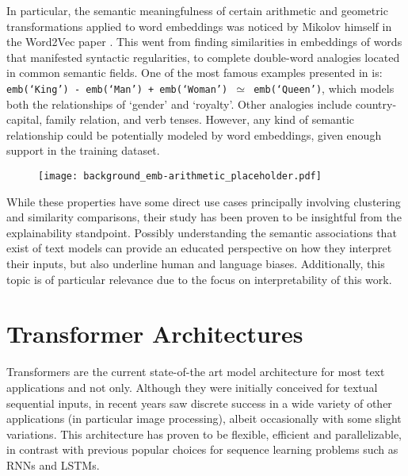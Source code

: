 In particular, the semantic meaningfulness of certain arithmetic and geometric transformations applied to word embeddings was noticed by Mikolov himself in the Word2Vec paper \cite{mikolov2013}.
This went from finding similarities in embeddings of words that manifested syntactic regularities, to complete double-word analogies located in common semantic fields.
One of the most famous examples presented in \cite{mikolov2013} is: \texttt{emb(`King') - emb(`Man') + emb(`Woman') $\simeq$ emb(`Queen')}, which models both the relationships of `gender' and `royalty'.
Other  analogies include country-capital, family relation, and verb tenses.
However, any kind of semantic relationship could be potentially modeled by word embeddings, given enough support in the training dataset.

\begin{figure}[H]
    \centering
    \texttt{[image: background\_emb-arithmetic\_placeholder.pdf]}
    \caption{}
    \label{fig:background_emb-arithmetic}
\end{figure}

While these properties have some direct use cases principally involving clustering and similarity comparisons, their study has been proven to be insightful from the explainability standpoint.
Possibly understanding the semantic associations that exist  of text models can provide an educated perspective on how they interpret their inputs, but also underline human and language biases.
Additionally, this topic is of particular relevance due to the focus on interpretability of this work.

\section{Transformer Architectures}

Transformers are the current state-of-the art model architecture for most text applications and not only.
Although they were initially conceived for textual sequential inputs, in recent years saw discrete success in a wide variety of other applications (in particular image processing), albeit occasionally with some slight variations.
This architecture has proven to be flexible, efficient and parallelizable, in contrast with previous popular choices for sequence learning problems such as RNNs and LSTMs.

